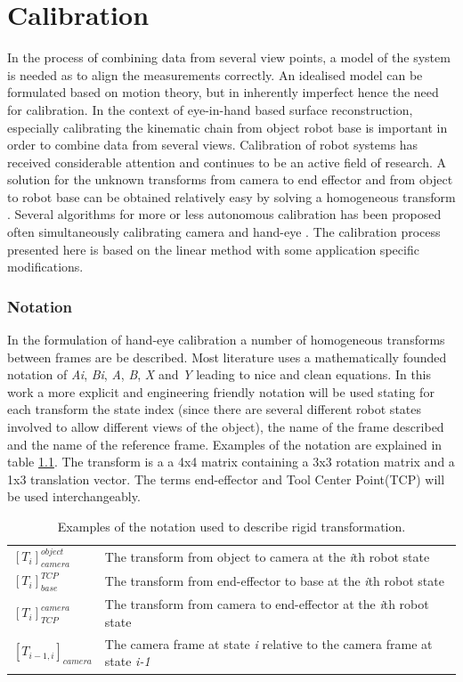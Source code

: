 \chapter{Calibration}
In the process of combining data from several view points, a model of the system is needed as to align the measurements correctly. An idealised model can be formulated based on motion theory, but in inherently imperfect hence the need for calibration. In the context of eye-in-hand based surface reconstruction, especially calibrating the kinematic chain from object robot base is important in order to combine data from several views. Calibration of robot systems has received considerable attention and continues to be an active field of research. A solution for the unknown transforms from camera to end effector and from object to robot base can be obtained relatively easy by solving a homogeneous transform \cite{Shiu1989}. Several algorithms for more or less autonomous calibration has been proposed \cite{Tsai1988, Tsai1989} often simultaneously calibrating camera and hand-eye \cite{Malm2003, Zhao2008, Jordt2009}. The calibration process presented here is based on the linear method \cite{Tsai1988} with some application specific modifications.


\subsection{Notation}
In the formulation of hand-eye calibration a number of homogeneous transforms between frames are be described. Most literature uses a mathematically founded notation of \textit{Ai}, \textit{Bi}, \textit{A}, \textit{B}, \textit{X} and \textit{Y} leading to nice and clean equations. In this work a more explicit and engineering friendly notation will be used stating for each transform the state index (since there are several different robot states involved to allow different views of the object), the name of the frame described and the name of the reference frame. Examples of the notation are explained in table \ref{tab:notation}. The transform is a a 4x4 matrix containing a 3x3 rotation matrix and a 1x3 translation vector. The terms end-effector and Tool Center Point(TCP) will be used interchangeably.\\

\begin{table}[h]
\caption{Examples of the notation used to describe rigid transformation.}
\begin{tabular}{ll}
\label{tab:notation}
$[T_{i}]_{camera}^{object}$   & The transform from object to camera at the \textit{i}th robot state          \\[8pt] 
$[T_{i}]_{base}^{TCP}$        & The transform from end-effector to base at the \textit{i}th robot state      \\[8pt] 
$[T_{i}]_{TCP}^{camera}$      & The transform from camera to end-effector at the \textit{i}th robot state     \\[8pt] 
$[T_{i-1,i}]_{camera}$        & The camera frame at state \textit{i} relative to the camera frame at state \textit{i-1}  \\[8pt]              
\end{tabular}
\end{table}

